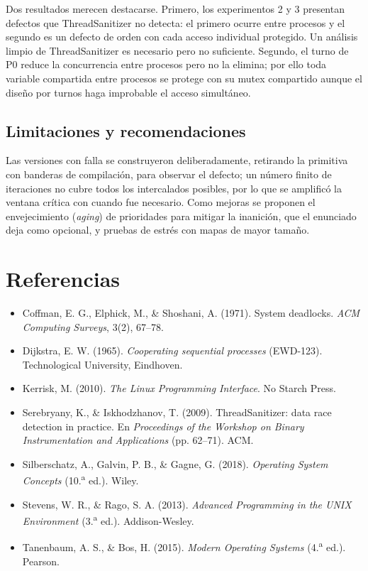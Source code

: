 \documentclass[11pt,a4paper]{article}
\newcommand{\cod}[1]{\texttt{\detokenize{#1}}}
\begin{document}
Dos resultados merecen destacarse. Primero, los experimentos 2 y 3 presentan defectos que ThreadSanitizer no detecta: el primero ocurre entre procesos y el segundo es un defecto de orden con cada acceso individual protegido. Un análisis limpio de ThreadSanitizer es necesario pero no suficiente. Segundo, el turno de P0 reduce la concurrencia entre procesos pero no la elimina; por ello toda variable compartida entre procesos se protege con su mutex compartido aunque el diseño por turnos haga improbable el acceso simultáneo.

\subsection{Limitaciones y recomendaciones}
Las versiones con falla se construyeron deliberadamente, retirando la primitiva con banderas de compilación, para observar el defecto; un número finito de iteraciones no cubre todos los intercalados posibles, por lo que se amplificó la ventana crítica con \cod{sched_yield()} cuando fue necesario. Como mejoras se proponen el envejecimiento (\emph{aging}) de prioridades para mitigar la inanición, que el enunciado deja como opcional, y pruebas de estrés con mapas de mayor tamaño.

\section{Referencias}

\begin{itemize}
  \item Coffman, E. G., Elphick, M., \& Shoshani, A. (1971). System deadlocks. \emph{ACM Computing Surveys}, 3(2), 67--78.
  \item Dijkstra, E. W. (1965). \emph{Cooperating sequential processes} (EWD-123). Technological University, Eindhoven.
  \item Kerrisk, M. (2010). \emph{The Linux Programming Interface}. No Starch Press.
  \item Serebryany, K., \& Iskhodzhanov, T. (2009). ThreadSanitizer: data race detection in practice. En \emph{Proceedings of the Workshop on Binary Instrumentation and Applications} (pp. 62--71). ACM.
  \item Silberschatz, A., Galvin, P. B., \& Gagne, G. (2018). \emph{Operating System Concepts} (10.\textsuperscript{a} ed.). Wiley.
  \item Stevens, W. R., \& Rago, S. A. (2013). \emph{Advanced Programming in the UNIX Environment} (3.\textsuperscript{a} ed.). Addison-Wesley.
  \item Tanenbaum, A. S., \& Bos, H. (2015). \emph{Modern Operating Systems} (4.\textsuperscript{a} ed.). Pearson.
\end{itemize}
\end{document}
